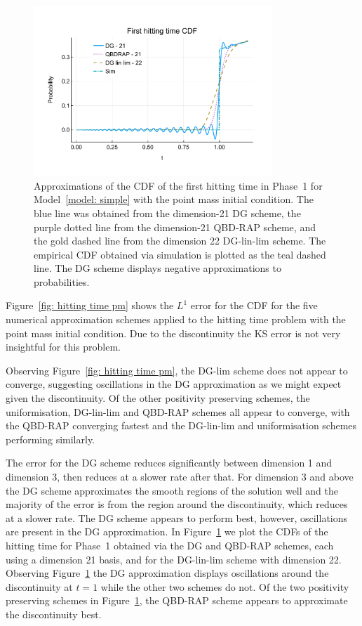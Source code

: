 \begin{figure}[h]
	\centering
	\includegraphics[width=0.8\textwidth,trim={0cm 1.25cm 0cm 1.25cm},clip]{chapter6/figs/hitting_times_model/hitting_times/point_mass/cdf_order21DG_and_sims.pdf}%
	\caption{Approximations of the CDF of the first hitting time in Phase~1 for Model~\ref{model: simple} with the point mass initial condition. The blue line was obtained from the dimension-21 DG scheme, the purple dotted line from the dimension-21 QBD-RAP scheme, and the gold dashed line from the dimension 22 DG-lin-lim scheme. The empirical CDF obtained via simulation is plotted as the teal dashed line. The DG scheme displays negative approximations to probabilities. } 
	\label{fig: hitting time oscillation} 
\end{figure}
Figure~\ref{fig: hitting time pm} shows the \(L^1\) error for the CDF for the five numerical approximation schemes applied to the hitting time problem with the point mass initial condition. Due to the discontinuity the KS error is not very insightful for this problem. 

Observing Figure~\ref{fig: hitting time pm}, the DG-lim scheme does not appear to converge, suggesting oscillations in the DG approximation as we might expect given the discontinuity. Of the other positivity preserving schemes, the uniformisation, DG-lin-lim and QBD-RAP schemes all appear to converge, with the QBD-RAP converging fastest and the DG-lin-lim and uniformisation schemes performing similarly. 

The error for the DG scheme reduces significantly between dimension 1 and dimension 3, then reduces at a slower rate after that. For dimension 3 and above the DG scheme approximates the smooth regions of the solution well and the majority of the error is from the region around the discontinuity, which reduces at a slower rate. The DG scheme appears to perform best, however, oscillations are present in the DG approximation. In Figure~\ref{fig: hitting time oscillation} we plot the CDFs of the hitting time for Phase~1 obtained via the DG and QBD-RAP schemes, each using a dimension 21 basis, and for the DG-lin-lim scheme with dimension 22. Observing Figure~\ref{fig: hitting time oscillation} the DG approximation displays oscillations around the discontinuity at \(t=1\) while the other two schemes do not. Of the two positivity preserving schemes in Figure~\ref{fig: hitting time oscillation}, the QBD-RAP scheme appears to approximate the discontinuity best. 


